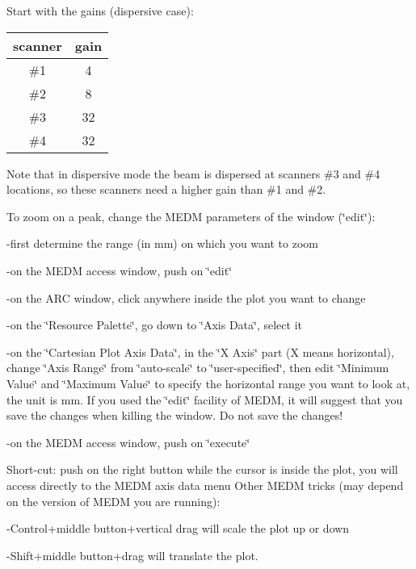 Start with the gains (dispersive case): 

\vspace{0.3cm}
{\centering \begin{tabular}{|c|c|}
\hline 
scanner&
gain\\
\hline 
\hline 
\#1&
4\\
\hline 
\#2&
8\\
\hline 
\#3&
32\\
\hline 
\#4&
32\\
\hline 
\end{tabular}\par}
\vspace{0.3cm}

Note that in dispersive mode the beam is dispersed at scanners \#3 and \#4 locations,
so these scanners need a higher gain than \#1 and \#2. 

To zoom on a peak, change the MEDM parameters of the window (\char`\"{}edit\char`\"{}): 

-first determine the range (in mm) on which you want to zoom 

-on the MEDM access window, push on \char`\"{}edit\char`\"{} 

-on the ARC window, click anywhere inside the plot you want to change 

-on the \char`\"{}Resource Palette\char`\"{}, go down to \char`\"{}Axis Data\char`\"{},
select it 

-on the \char`\"{}Cartesian Plot Axis Data\char`\"{}, in the \char`\"{}X Axis\char`\"{}
part (X means horizontal), change \char`\"{}Axis Range\char`\"{} from \char`\"{}auto-scale\char`\"{}
to \char`\"{}user-specified\char`\"{}, then edit \char`\"{}Minimum Value\char`\"{}
and \char`\"{}Maximum Value\char`\"{} to specify the horizontal range you want
to look at, the unit is mm. If you used the \char`\"{}edit\char`\"{} facility
of MEDM, it will suggest that you save the changes when killing the window. Do
not save the changes! 

-on the MEDM access window, push on \char`\"{}execute\char`\"{} 

Short-cut: push on the right button while the cursor is inside the plot, you
will access directly to the MEDM axis data menu Other MEDM tricks (may depend
on the version of MEDM you are running): 

-Control+middle button+vertical drag will scale the plot up or down 

-Shift+middle button+drag will translate the plot. 


